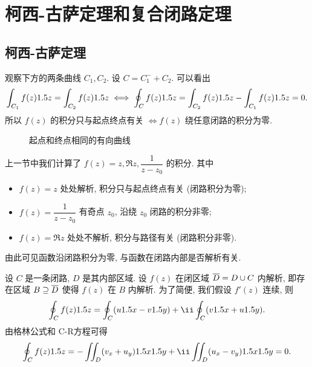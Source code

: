\section{柯西-古萨定理和复合闭路定理}

\subsection{柯西-古萨定理}

观察下方的两条曲线 $C_1,C_2$. 设 $C=C_1^-+C_2$. 可以看出
\[
  \int_{C_1}f(z)1.5 z=\int_{C_2}f(z)1.5 z\iff
  \oint_C f(z)1.5 z=\int_{C_2}f(z)1.5 z-\int_{C_1}f(z)1.5 z=0.
\]
所以 \alert{$f(z)$ 的积分只与起点终点有关 $\iff f(z)$ 绕任意闭路的积分为零}.

\begin{figure}[!htb]
  \centering
  \caption{起点和终点相同的有向曲线}
\end{figure}

上一节中我们计算了 $f(z)=z,\Re z,\dfrac1{z-z_0}$ 的积分.
其中
\begin{itemize}
  \item $f(z)=z$ 处处解析, 积分只与起点终点有关 (闭路积分为零);
  \item $f(z)=\dfrac1{z-z_0}$ 有奇点 $z_0$, 沿绕 $z_0$ 闭路的积分非零;
  \item $f(z)=\Re z$ 处处不解析, 积分与路径有关 (闭路积分非零).
\end{itemize}\parnoindent
由此可见函数沿闭路积分为零,
与函数在闭路内部是否解析有关.

设 $C$ 是一条闭路, $D$ 是其内部区域.
设 $f(z)$ 在闭区域 $\overline D=D\cup C$ 内解析, 即存在区域 $B\supseteq\overline D$ 使得 $f(z)$ 在 $B$ 内解析.
为了简便, 我们假设 $f'(z)$ 连续,
则
\[
   \oint_C f(z)\d z
  =\oint_C(u\d x-v\d y)+\ii\oint_C(v\d x+u\d y).
\]
由格林公式和 C-R方程可得
\[
   \oint_C f(z)\d z
  =-\iint_D(v_x+u_y)\d x\d y+\ii\iint_D(u_x-v_y)\d x\d y
  =0.
\]

